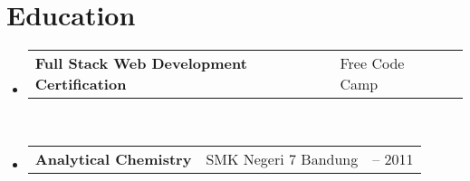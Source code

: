 \documentclass[a4paper, 11pt]{article}
\newcommand{\resumeSubheading}[4]{
  \vspace{-2pt}\item
    \begin{tabularx}{0.987\textwidth}[t]{ 
  >{\raggedright\arraybackslash}X 
  >{\centering\arraybackslash}X 
  >{\raggedleft\arraybackslash}X }
      \textbf{#1} & #2 & #3 \\
    \end{tabularx}
    \textit{\small#4}\\
    \vspace{-7pt}
}
\newcommand{\resumeSubHeadingListStart}{\begin{itemize}[leftmargin=0.1in, label={}]}
\newcommand{\resumeSubHeadingListEnd}{\end{itemize}\vspace{5pt}}
\begin{document}
\section{Education}
    \resumeSubHeadingListStart
        \resumeSubheading
            {Full Stack Web Development Certification}{Free Code Camp}{2016}{}
        \resumeSubheading
            {Analytical Chemistry}{SMK Negeri 7 Bandung}{2009 -- 2011}{}
    \resumeSubHeadingListEnd
\end{document}
